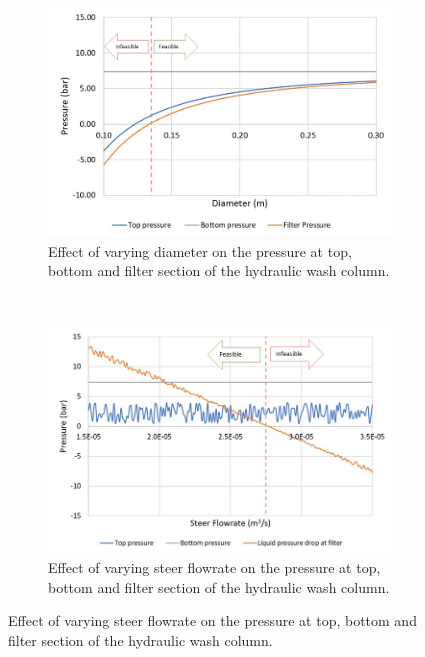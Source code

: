 \begin{figure}[H]
    \centering
    \begin{subfigure}[t]{0.5\textwidth}
        \centering
        \includegraphics[width=\linewidth]{chapters/3-separation/figures/diameter.jpg}
        \caption{Effect of varying diameter on the pressure at top, bottom and filter section of the hydraulic wash column.} 
        \label{fig:dia_col}
        \end{subfigure}%
    ~ 
    \begin{subfigure}[t]{0.5\textwidth}
        \centering
        \includegraphics[width=\linewidth]{chapters/3-separation/figures/steerflow.jpg}
        \caption{Effect of varying steer flowrate on the pressure at top, bottom and filter section of the hydraulic wash column.}
    \label{fig:steer}   
    \end{subfigure}

\end{figure}


